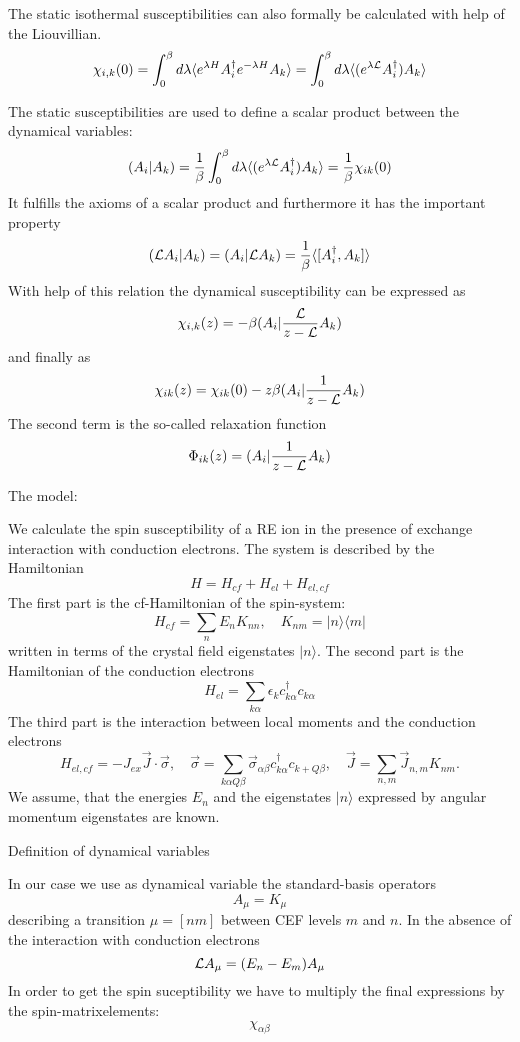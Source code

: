 The static isothermal susceptibilities can also formally be calculated with help of
the Liouvillian.   
$$
\chi_{i,k}(0) = \int_0^\beta d \lambda \langle e^{\lambda H}
A_i^\dagger e^{-\lambda H}  A_k\rangle
 = \int_0^\beta d \lambda \langle (e^{\lambda {\cal L}}
A_i^\dagger)   A_k\rangle
$$


The static susceptibilities are used to define a scalar product between  the
dynamical variables:
$$
(A_i \vert A_k) =  {1\over \beta }\int_0^\beta d\lambda \langle
(e^{\lambda{\cal L}}A_i^\dagger)A_k\rangle ={1\over \beta} \chi_{ik}(0)
$$
It fulfills the axioms of a scalar product and  furthermore it has the important property
$$
({\cal L}A_i\vert A_k)=(A_i\vert {\cal L}A_k)={1\over \beta}\langle
[A_i^\dagger,A_k]\rangle
$$
With help of this relation the dynamical susceptibility can be
expressed as
$$
\chi_{i,k}(z)= -\beta (A_i\vert {{\cal L}\over {z-\cal L}} A_k)
$$
and finally as 
$$
\chi_{ik}(z)=\chi_{ik}(0)-z\beta (A_i\vert {1\over {z-\cal L}}A_k)  
$$
The second term is the so-called relaxation function 
$$
\Phi_{ik}(z)=(A_i \vert {1 \over {z-\cal L}}A_k)
$$

\bigskip




\noindent
The model:



We calculate the spin susceptibility of a RE ion in the presence of exchange
interaction with conduction electrons. The system is described by the
Hamiltonian
$$
H=H_{cf}+H_{el}+H_{el,cf} 
$$
The first part is the cf-Hamiltonian of the spin-system: 
$$ 
H_{cf}= \sum_n E_n K_{nn}, \quad K_{nm}= \vert n\rangle \langle m\vert
$$  
written in terms of the crystal field eigenstates $\vert n\rangle$. 
The second part is the Hamiltonian of the conduction electrons
$$
H_{el}=\sum_{k\alpha}\epsilon_kc^\dagger_{k\alpha}c_{k\alpha}
$$
The third part is the 
 interaction between local moments and  the conduction electrons
$$
H_{el,cf}= - J_{ex}\vec J \cdot \vec \sigma, \quad \vec \sigma = \sum_{k\alpha
Q\beta}\vec \sigma_{\alpha\beta}c^\dagger_{k\alpha}c_{k+Q\beta}, \quad \vec
J=\sum_{n,m}\vec J_{n,m}K_{nm}.
$$
We assume, that the energies $E_n$ and the eigenstates $\vert n\rangle$
expressed by angular momentum eigenstates are known.

\bigskip
\noindent
Definition of dynamical variables

In our case we use as dynamical variable the standard-basis operators
$$
A_\mu= K_{\mu}
$$
 describing a  transition $\mu= [nm]$ between CEF levels $m$ and $n$. 
In the absence of the interaction with conduction electrons
$$
{\cal L}A_\mu = (E_n-E_m)A_\mu
$$
In order to
get the spin suceptibility we have to multiply the final expressions by the
spin-matrixelements:
$$ 
\chi_{\alpha \beta}   
$$

